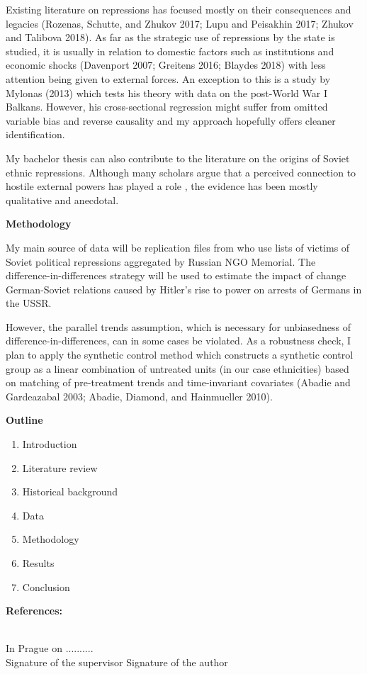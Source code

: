 \noindent Existing literature on repressions has focused mostly on their consequences and legacies (Rozenas, Schutte, and Zhukov 2017; Lupu and Peisakhin 2017; Zhukov and Talibova 2018). As far as the strategic use of repressions by the state is studied, it is usually in relation to domestic factors such as institutions and economic shocks (Davenport 2007; Greitens 2016; Blaydes 2018) with less attention being given to external forces. An exception to this is a study by Mylonas (2013) which tests his theory with data on the post-World War I Balkans. However, his cross-sectional regression might suffer from omitted variable bias and reverse causality and my approach hopefully offers cleaner identification. 

My bachelor thesis can also contribute to the literature on the origins of Soviet ethnic repressions. Although many scholars argue that a perceived connection to hostile external powers has played a role \citep{martin_origins_1998, polian_against_2003}, the evidence has been mostly qualitative and anecdotal. 

\noindent \large{\bf Methodology}

\noindent My main source of data will be replication files from \citet{zhukov_stalins_2018} who use lists of victims of Soviet political repressions aggregated by Russian NGO Memorial. The difference-in-differences strategy will be used to estimate the impact of change German-Soviet relations caused by Hitler’s rise to power on arrests of Germans in the USSR. 

However, the parallel trends assumption, which is necessary for unbiasedness of difference-in-differences, can in some cases be violated. As a robustness check, I plan to apply the synthetic control method which constructs a synthetic control group as a linear combination of untreated units (in our case ethnicities) based on matching of pre-treatment trends and time-invariant covariates %
(Abadie and Gardeazabal 2003; Abadie, Diamond, and Hainmueller 2010). 

\noindent \large{\bf  Outline}
\begin{enumerate}
\item Introduction
 \item Literature review 
 \item Historical background
 \item Data
 \item Methodology
 \item Results
 \item Conclusion 
\end{enumerate}
\medskip
\large{\bf References:}
\printbibliography[keyword=major, heading=none]

\vspace{15mm}\\
In Prague on ..........\newline \\
Signature of the supervisor \hspace{30mm} Signature of the author
